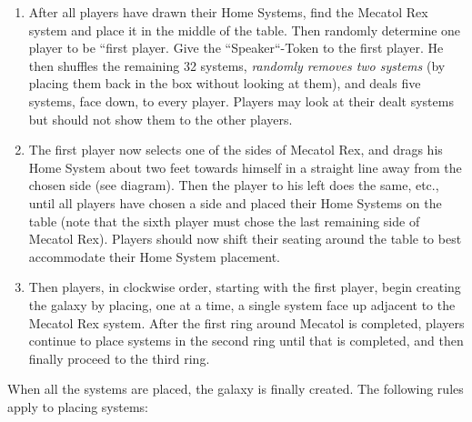 \documentclass[11pt,fleqn]{book} %
\begin{document}
\begin{enumerate}
\item After all players have drawn their Home Systems, find the Mecatol Rex system and place it in the middle of the table. Then randomly determine one player to be “first player. Give the “Speaker“-Token to the first player. He then shuffles the remaining 32 systems, \emph{randomly removes two systems} (by placing them back in the box without looking at them), and deals five systems, face down, to every player. Players may look at their dealt systems but should not show them to the other players.
\item The first player now selects one of the sides of Mecatol Rex, and drags his Home System about two feet towards himself in a straight line away from the chosen side (see diagram). Then the player to his left does the same, etc., until all players have chosen a side and placed their Home Systems on the table (note that the sixth player must chose the last remaining side of Mecatol Rex). Players should now shift their seating around the table to best accommodate their Home System placement.
\item Then players, in clockwise order, starting with the first player, begin creating the galaxy by placing, one at a time, a single system face up adjacent to the Mecatol Rex system. After the first ring around Mecatol is completed, players continue to place systems in the second ring until that is completed, and then finally proceed to the third ring.
\end{enumerate}

When all the systems are placed, the galaxy is finally created. The following rules apply to placing systems:
\end{document}
